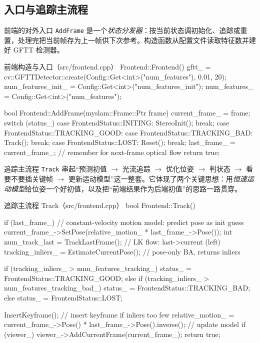 \subsection{入口与追踪主流程}
\label{sec:sys-track}

前端的对外入口 \texttt{AddFrame} 是一个\emph{状态分发器}：按当前状态调初始化、追踪或重置，处理完把当前帧存为上一帧供下次参考。构造函数从配置文件读取特征数并建好 GFTT 检测器。

\begin{codebox}[C++]{前端构造与入口（src/frontend.cpp）}
Frontend::Frontend() {
    gftt_ = cv::GFTTDetector::create(Config::Get<int>("num_features"), 0.01, 20);
    num_features_init_ = Config::Get<int>("num_features_init");
    num_features_      = Config::Get<int>("num_features");
}

bool Frontend::AddFrame(myslam::Frame::Ptr frame) {
    current_frame_ = frame;
    switch (status_) {
        case FrontendStatus::INITING:        StereoInit(); break;
        case FrontendStatus::TRACKING_GOOD:
        case FrontendStatus::TRACKING_BAD:   Track();      break;
        case FrontendStatus::LOST:           Reset();      break;
    }
    last_frame_ = current_frame_;            // remember for next-frame optical flow
    return true;
}
\end{codebox}

\noindent 追踪主流程 \texttt{Track} 串起“预测初值 $\to$ 光流追踪 $\to$ 优化位姿 $\to$ 判状态 $\to$ 看要不要插关键帧 $\to$ 更新运动模型”这一整套。它体现了两个关键思想：用\emph{恒速运动模型}给位姿一个好初值，以及把“前端结果作为后端初值”的思路一路贯穿。

\begin{codebox}[C++]{追踪主流程 Track（src/frontend.cpp）}
bool Frontend::Track() {
    if (last_frame_) {
        // constant-velocity motion model: predict pose as init guess
        current_frame_->SetPose(relative_motion_ * last_frame_->Pose());
    }
    int num_track_last = TrackLastFrame();        // LK flow: last->current (left)
    tracking_inliers_  = EstimateCurrentPose();   // pose-only BA, returns inliers

    if (tracking_inliers_ > num_features_tracking_)          status_ = FrontendStatus::TRACKING_GOOD;
    else if (tracking_inliers_ > num_features_tracking_bad_) status_ = FrontendStatus::TRACKING_BAD;
    else                                                     status_ = FrontendStatus::LOST;

    InsertKeyframe();                              // insert keyframe if inliers too few
    relative_motion_ = current_frame_->Pose() * last_frame_->Pose().inverse(); // update model
    if (viewer_) viewer_->AddCurrentFrame(current_frame_);
    return true;
}
\end{codebox}

